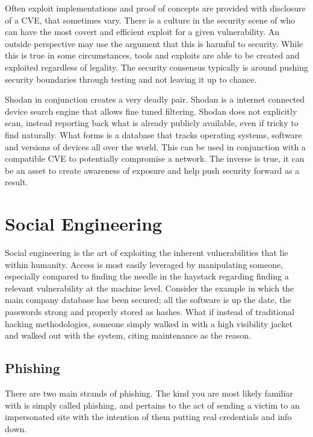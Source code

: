 Often exploit implementations and proof of concepts are provided with disclosure of a CVE, that sometimes vary.
There is a culture in the security scene of who can have the most covert and efficient exploit for a given vulnerability. An outside perspective may use the argument that this is harmful to security. While this is true in some circumstances, tools and exploits are able to be created and exploited regardless of legality.
The security consensus typically is around pushing security boundaries through testing and not leaving it up to chance. 


Shodan in conjunction creates a very deadly pair. Shodan is a internet connected device search engine that allows fine tuned filtering.
Shodan does not explicitly scan, instead reporting back what is already publicly available, even if tricky to find naturally. What forms is a database that 
tracks operating systems, software and versions of devices all over the world. This can be used in conjunction with a compatible CVE to potentially compromise a network.
The inverse is true, it can be an asset to create awareness of exposure and help push security forward as a result.


\section{Social Engineering}
Social engineering is the art of exploiting the inherent vulnerabilities that lie within humanity. Access is most easily leveraged by manipulating someone, especially compared to finding the needle in the haystack regarding finding a relevant vulnerability at the machine level. 
Consider the example in which the main company database has been secured; all the software is up the date, the passwords strong and properly stored as hashes. What if instead of traditional hacking methodologies, someone simply walked in with a high visibility jacket and walked out with the system, 
citing maintenance as the reason. \citep{AssignmentSecurityForensicsPaper}


\subsection{Phishing}
There are two main strands of phishing. The kind you are most likely familiar with is simply called phishing, and pertains to the act of sending a victim to an impersonated site with the intention of them putting real credentials and info down. 

